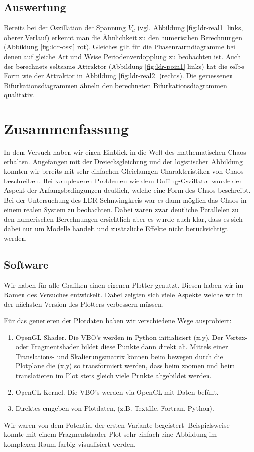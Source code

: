 \documentclass[12pt,a4paper]{article}
\begin{document}
\subsection { Auswertung }
Bereits bei der Oszillation der Spannung $V_d$ (vgl. Abbildung \ref{fig:ldr-real1} links, oberer Verlauf) erkennt man die Ähnlichkeit zu den numerischen Berechnungen (Abbildung \ref{fig:ldr-oszi} rot). Gleiches gilt für die Phasenraumdiagramme bei denen auf gleiche Art und Weise Periodenverdopplung zu beobachten ist. Auch der berechnete seltsame Attraktor (Abbildung \ref{fig:ldr-poin1} links) hat die selbe Form wie der Attraktor in Abbildung \ref{fig:ldr-real2} (rechts).
\newline
Die gemessenen Bifurkationsdiagrammen ähneln den berechneten Bifurkationsdiagrammen qualitativ.

\section { Zusammenfassung }
In dem Versuch haben wir einen Einblick in die Welt des mathematischen Chaos erhalten. Angefangen mit der Dreiecksgleichung und der logistischen Abbildung konnten wir bereits mit sehr einfachen Gleichungen Charakteristiken von Chaos beschreiben. Bei komplexeren Problemen wie dem Duffing-Oszillator wurde der Aspekt der Anfangsbedingungen deutlich, welche eine Form des Chaos beschreibt. Bei der Untersuchung des LDR-Schnwingkreis war es dann möglich das Chaos in einem realen System zu beobachten. Dabei waren zwar deutliche Parallelen zu den numerischen Berechnungen ersichtlich aber es wurde auch klar, dass es sich dabei nur um Modelle handelt und zusätzliche Effekte nicht berücksichtigt werden.
\subsection{Software}
Wir haben für alle Grafiken einen eigenen Plotter genutzt. Diesen haben wir im Ramen des Versuches entwickelt. Dabei zeigten sich viele Aspekte welche wir in der nächsten Version des Plotters verbessern müssen.

Für das generieren der Plotdaten haben wir verschiedene Wege ausprobiert:
\begin{enumerate}
\item OpenGL Shader. Die VBO's werden in Python initialisiert (x,y). Der Vertex- oder Fragmentshader bildet diese Punkte dann direkt ab. Mittels einer Translations- und Skalierungsmatrix können beim bewegen durch die Plotplane die (x,y) so transformiert werden, dass beim zoomen und beim translatieren im Plot stets gleich viele Punkte abgebildet werden. 
\item OpenCL Kernel. Die VBO's werden via OpenCL mit Daten befüllt. 
\item Direktes eingeben von Plotdaten, (z.B. Textfile, Fortran, Python).
\end{enumerate}
Wir waren von dem Potential der ersten Variante begeistert. Beispielsweise konnte mit einem Fragmentshader Plot sehr einfach eine Abbildung im komplexen Raum farbig visualisiert werden. 
\end{document}
